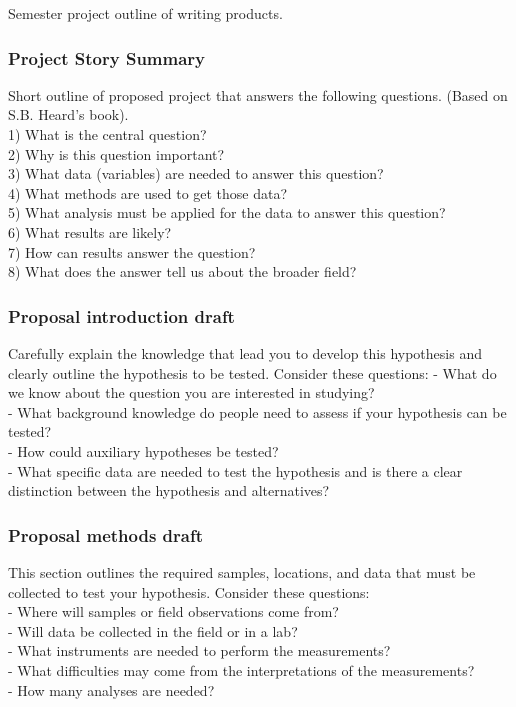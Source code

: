 \documentclass[11pt,]{article}
\begin{document}
Semester project outline of writing products.

\hypertarget{project-story-summary}{%
\subsubsection{Project Story Summary}\label{project-story-summary}}

Short outline of proposed project that answers the following questions.
(Based on S.B. Heard's book).\\
1) What is the central question?\\
2) Why is this question important?\\
3) What data (variables) are needed to answer this question?\\
4) What methods are used to get those data?\\
5) What analysis must be applied for the data to answer this question?\\
6) What results are likely?\\
7) How can results answer the question?\\
8) What does the answer tell us about the broader field?

\hypertarget{proposal-introduction-draft}{%
\subsubsection{Proposal introduction
draft}\label{proposal-introduction-draft}}

Carefully explain the knowledge that lead you to develop this hypothesis
and clearly outline the hypothesis to be tested. Consider these
questions: - What do we know about the question you are interested in
studying?\\
- What background knowledge do people need to assess if your hypothesis
can be tested?\\
- How could auxiliary hypotheses be tested?\\
- What specific data are needed to test the hypothesis and is there a
clear distinction between the hypothesis and alternatives?

\hypertarget{proposal-methods-draft}{%
\subsubsection{Proposal methods draft}\label{proposal-methods-draft}}

This section outlines the required samples, locations, and data that
must be collected to test your hypothesis. Consider these questions:\\
- Where will samples or field observations come from?\\
- Will data be collected in the field or in a lab?\\
- What instruments are needed to perform the measurements?\\
- What difficulties may come from the interpretations of the
measurements?\\
- How many analyses are needed?
\end{document}
